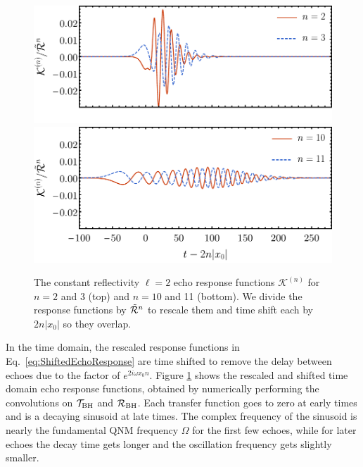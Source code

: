 \begin{refsection}
\begin{figure}[t]
\includegraphics[width=0.98\columnwidth]{chapter_echo/etc/Kplot1.pdf}\\
\vspace{-14.5pt}
\includegraphics[width=0.98\columnwidth]{chapter_echo/etc/Kplot2.pdf}
\caption{
The constant reflectivity $\ell = 2$ echo response functions $\mathcal K^{(n)}$ for $n=2$ and 3 (top) and $n=10$ and 11 (bottom). We divide the response functions by $\tilde{\mathcal R}^n$ to rescale them and time shift each by $2 n |x_0|$ so they overlap.
}
\label{fig:Echotransfertime}
\end{figure}

In the time domain, the rescaled response functions in Eq.~\eqref{eq:ShiftedEchoResponse} are time shifted to remove the delay between echoes due to the factor of $e^{2i\omega x_0 n}$. Figure \ref{fig:Echotransfertime} shows the rescaled and shifted time domain echo response functions, obtained by numerically performing the convolutions on $\mathcal T_{\rm BH}$ and $\mathcal R_{\rm BH}$.
Each transfer function goes to zero at early times and is a decaying sinusoid at late times. The complex frequency of the sinusoid is nearly the fundamental QNM frequency $\Omega$ for the first few echoes, while for later echoes the decay time gets longer and the oscillation frequency gets slightly smaller. 


\end{refsection}
